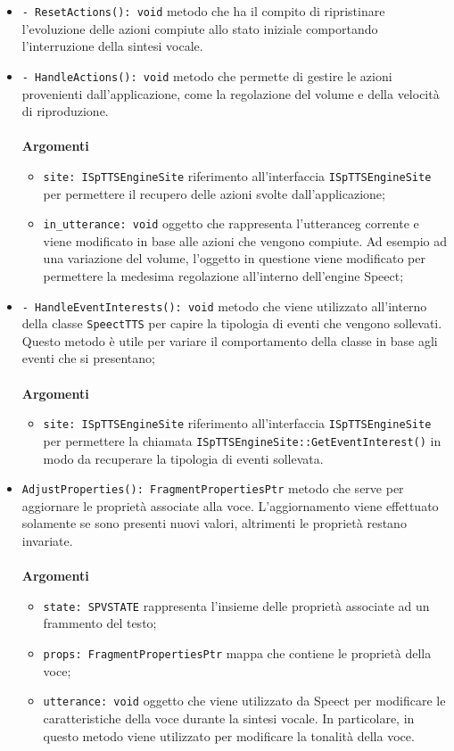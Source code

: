 \begin{itemize}
\begin{itemize}
	\end{itemize}
	\item \texttt{- ResetActions(): void} metodo che ha il compito di ripristinare l'evoluzione delle azioni compiute allo stato iniziale comportando l'interruzione della sintesi vocale.
	\item \texttt{- HandleActions(): void} metodo che permette di gestire le azioni provenienti dall'applicazione, come la regolazione del volume e della velocità di riproduzione.
	\\\\
	\textbf{Argomenti}
	\begin{itemize}
		\item \texttt{site: ISpTTSEngineSite} riferimento all'interfaccia \texttt{ISpTTSEngineSite} per permettere il recupero delle azioni svolte dall'applicazione;
		\item \texttt{in\_utterance: void} oggetto che rappresenta l'\gls{utteranceg} corrente e  viene modificato in base alle azioni che vengono compiute. Ad esempio ad una variazione del volume, l'oggetto in questione viene modificato per permettere la medesima regolazione all'interno dell'engine Speect;
	\end{itemize}
	\item \texttt{- HandleEventInterests(): void} metodo che viene utilizzato all'interno della classe \texttt{SpeectTTS} per capire la tipologia di eventi che vengono sollevati. Questo metodo è utile per variare il comportamento della classe in base agli eventi che si presentano;\\\\
	\textbf{Argomenti}
	\begin{itemize}
		\item \texttt{site: ISpTTSEngineSite} riferimento all'interfaccia \texttt{ISpTTSEngineSite} per permettere la chiamata \texttt{ISpTTSEngineSite::GetEventInterest()} in modo da recuperare la tipologia di eventi sollevata.
	\end{itemize}
	\item \texttt{AdjustProperties(): FragmentPropertiesPtr} metodo che serve per aggiornare le proprietà associate alla voce. L'aggiornamento viene effettuato solamente se sono presenti nuovi valori, altrimenti le proprietà restano invariate.
	\\\\
	\textbf{Argomenti}
	\begin{itemize}
		\item \texttt{state: SPVSTATE} rappresenta l'insieme delle proprietà associate ad un frammento del testo;
		\item \texttt{props: FragmentPropertiesPtr} mappa che contiene le proprietà della voce;
		\item \texttt{utterance: void} oggetto che viene utilizzato da Speect per modificare le caratteristiche della voce durante la sintesi vocale. In particolare, in questo metodo viene utilizzato per modificare la tonalità della voce.
	\end{itemize} 		
\end{itemize}
